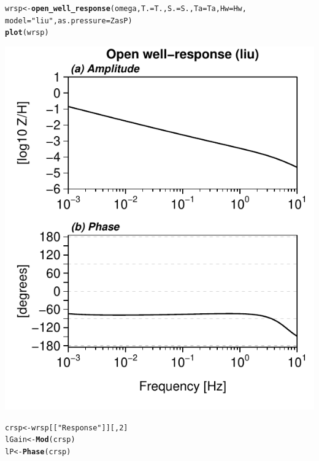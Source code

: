 \documentclass[12pt]{article}\usepackage[]{graphicx}\usepackage[]{color}
\makeatletter
\def\maxwidth{ %
  \ifdim\Gin@nat@width>\linewidth
    \linewidth
  \else
    \Gin@nat@width
  \fi
}
\newcommand{\hlnum}[1]{\textcolor[rgb]{0.686,0.059,0.569}{#1}}%
\newcommand{\hlstr}[1]{\textcolor[rgb]{0.192,0.494,0.8}{#1}}%
\newcommand{\hlstd}[1]{\textcolor[rgb]{0.345,0.345,0.345}{#1}}%
\newcommand{\hlkwb}[1]{\textcolor[rgb]{0.69,0.353,0.396}{#1}}%
\newcommand{\hlkwc}[1]{\textcolor[rgb]{0.333,0.667,0.333}{#1}}%
\newcommand{\hlkwd}[1]{\textcolor[rgb]{0.737,0.353,0.396}{\textbf{#1}}}%
\newenvironment{kframe}{%
 \def\at@end@of@kframe{}%
 \ifinner\ifhmode%
  \def\at@end@of@kframe{\end{minipage}}%
  \begin{minipage}{\columnwidth}%
 \fi\fi%
 \def\FrameCommand##1{\hskip\@totalleftmargin \hskip-\fboxsep
 \colorbox{shadecolor}{##1}\hskip-\fboxsep
     \hskip-\linewidth \hskip-\@totalleftmargin \hskip\columnwidth}%
 \MakeFramed {\advance\hsize-\width
   \@totalleftmargin\z@ \linewidth\hsize
   \@setminipage}}%
 {\par\unskip\endMakeFramed%
 \at@end@of@kframe}
\newenvironment{knitrout}{}{} %
\makeatother
\begin{document}
\begin{knitrout}\small
{}\color{fgcolor}\begin{kframe}
\begin{alltt}
\hlstd{wrsp} \hlkwb{<-} \hlkwd{open_well_response}\hlstd{(omega,} \hlkwc{T.} \hlstd{= T.,} \hlkwc{S.} \hlstd{= S.,} \hlkwc{Ta} \hlstd{= Ta,} \hlkwc{Hw} \hlstd{= Hw,}
    \hlkwc{model} \hlstd{=} \hlstr{"liu"}\hlstd{,} \hlkwc{as.pressure} \hlstd{= ZasP)}
\hlkwd{plot}\hlstd{(wrsp)}
\end{alltt}
\end{kframe}
\includegraphics[width=\maxwidth]{figure/LIURESP-1} 
\begin{kframe}\begin{alltt}
\hlstd{crsp} \hlkwb{<-} \hlstd{wrsp[[}\hlstr{"Response"}\hlstd{]][,} \hlnum{2}\hlstd{]}
\hlstd{lGain} \hlkwb{<-} \hlkwd{Mod}\hlstd{(crsp)}
\hlstd{lP} \hlkwb{<-} \hlkwd{Phase}\hlstd{(crsp)}
\end{alltt}
\end{kframe}
\end{knitrout}
\end{document}
